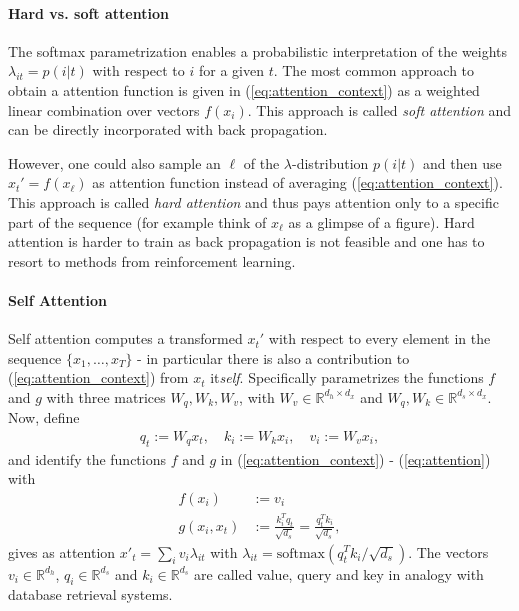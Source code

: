 \documentclass[12pt,a4paper]{article}
\begin{document}
\paragraph{Hard vs. soft attention}
The softmax parametrization enables a probabilistic interpretation of the weights $\lambda_{it} = p(i | t)$ with respect to $i$ for a given $t$. The most common approach to obtain a attention function is given in (\ref{eq:attention_context}) as a weighted linear combination over vectors $f(x_i)$. This approach is called \textit{soft attention} and can be directly incorporated with back propagation.

However, one could also sample an $\ell$ of the  $\lambda$-distribution $p(i | t)$  and then use $x_t' = f(x_\ell)$ as attention function instead of averaging (\ref{eq:attention_context}). This approach is called \textit{hard attention} and thus  pays attention only to a specific part of the sequence (for example think of $x_\ell$ as a glimpse of a figure). Hard attention is harder to train as back propagation is not feasible and one has to resort to methods from reinforcement learning.
 
\paragraph{Self Attention}
Self attention computes a transformed $x_t'$ with respect to every element in the sequence $\{x_1, \dots, x_T\}$ - in particular there is also a contribution to (\ref{eq:attention_context}) from $x_t$ it\textit{self}.
Specifically  \cite{vaswani2017attention} parametrizes the  functions $f$ and $g$ with three matrices $W_q,W_k,W_v$, with $W_v \in \mathbb{R}^{d_h \times d_x}$ and $W_q, W_k \in \mathbb{R}^{d_s \times d_x}$. Now, define 
\begin{align}
 q_t := W_q x_t, \quad
 k_i := W_k x_i,  \quad
 v_i :=  W_v x_i,  
 \end{align}
 and identify the functions $f$ and $g$ in  (\ref{eq:attention_context}) - (\ref{eq:attention}) with
 \begin{align}
f(x_i) &:= v_i \\ 
g(x_i, x_t) &:= \frac{k_i ^T q_t}{\sqrt{d_s}} =  \frac{q_t^T  k_i}{\sqrt{d_s}}, 
\end{align}
gives as attention $x'_t = \sum_i v_i \lambda _{it} $
with $\lambda _{it}  = \text{softmax}(q_t^T  k_i/\sqrt{d_s})$. The vectors $v_i  \in \mathbb R^{d_h} $, $q_i\in \mathbb R^{d_s} $ and $k_i \in \mathbb R^{d_s} $ are called value, query and key in analogy with database retrieval systems. 
\end{document}
